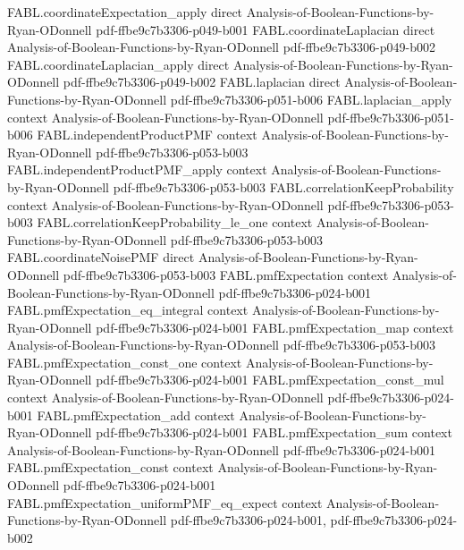 \begin{theorem}
\proofstep
  {FABL.coordinateExpectation_apply}
  {direct}
  {Analysis-of-Boolean-Functions-by-Ryan-ODonnell}
  {pdf-ffbe9c7b3306-p049-b001}
\proofstep
  {FABL.coordinateLaplacian}
  {direct}
  {Analysis-of-Boolean-Functions-by-Ryan-ODonnell}
  {pdf-ffbe9c7b3306-p049-b002}
\proofstep
  {FABL.coordinateLaplacian_apply}
  {direct}
  {Analysis-of-Boolean-Functions-by-Ryan-ODonnell}
  {pdf-ffbe9c7b3306-p049-b002}
\proofstep
  {FABL.laplacian}
  {direct}
  {Analysis-of-Boolean-Functions-by-Ryan-ODonnell}
  {pdf-ffbe9c7b3306-p051-b006}
\proofstep
  {FABL.laplacian_apply}
  {context}
  {Analysis-of-Boolean-Functions-by-Ryan-ODonnell}
  {pdf-ffbe9c7b3306-p051-b006}
\proofstep
  {FABL.independentProductPMF}
  {context}
  {Analysis-of-Boolean-Functions-by-Ryan-ODonnell}
  {pdf-ffbe9c7b3306-p053-b003}
\proofstep
  {FABL.independentProductPMF_apply}
  {context}
  {Analysis-of-Boolean-Functions-by-Ryan-ODonnell}
  {pdf-ffbe9c7b3306-p053-b003}
\proofstep
  {FABL.correlationKeepProbability}
  {context}
  {Analysis-of-Boolean-Functions-by-Ryan-ODonnell}
  {pdf-ffbe9c7b3306-p053-b003}
\proofstep
  {FABL.correlationKeepProbability_le_one}
  {context}
  {Analysis-of-Boolean-Functions-by-Ryan-ODonnell}
  {pdf-ffbe9c7b3306-p053-b003}
\proofstep
  {FABL.coordinateNoisePMF}
  {direct}
  {Analysis-of-Boolean-Functions-by-Ryan-ODonnell}
  {pdf-ffbe9c7b3306-p053-b003}
\proofstep
  {FABL.pmfExpectation}
  {context}
  {Analysis-of-Boolean-Functions-by-Ryan-ODonnell}
  {pdf-ffbe9c7b3306-p024-b001}
\proofstep
  {FABL.pmfExpectation_eq_integral}
  {context}
  {Analysis-of-Boolean-Functions-by-Ryan-ODonnell}
  {pdf-ffbe9c7b3306-p024-b001}
\proofstep
  {FABL.pmfExpectation_map}
  {context}
  {Analysis-of-Boolean-Functions-by-Ryan-ODonnell}
  {pdf-ffbe9c7b3306-p053-b003}
\proofstep
  {FABL.pmfExpectation_const_one}
  {context}
  {Analysis-of-Boolean-Functions-by-Ryan-ODonnell}
  {pdf-ffbe9c7b3306-p024-b001}
\proofstep
  {FABL.pmfExpectation_const_mul}
  {context}
  {Analysis-of-Boolean-Functions-by-Ryan-ODonnell}
  {pdf-ffbe9c7b3306-p024-b001}
\proofstep
  {FABL.pmfExpectation_add}
  {context}
  {Analysis-of-Boolean-Functions-by-Ryan-ODonnell}
  {pdf-ffbe9c7b3306-p024-b001}
\proofstep
  {FABL.pmfExpectation_sum}
  {context}
  {Analysis-of-Boolean-Functions-by-Ryan-ODonnell}
  {pdf-ffbe9c7b3306-p024-b001}
\proofstep
  {FABL.pmfExpectation_const}
  {context}
  {Analysis-of-Boolean-Functions-by-Ryan-ODonnell}
  {pdf-ffbe9c7b3306-p024-b001}
\proofstep
  {FABL.pmfExpectation_uniformPMF_eq_expect}
  {context}
  {Analysis-of-Boolean-Functions-by-Ryan-ODonnell}
  {pdf-ffbe9c7b3306-p024-b001,
    pdf-ffbe9c7b3306-p024-b002}

\end{theorem}
